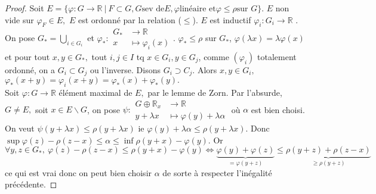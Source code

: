 \begin{proof}
    Soit $E=\{\varphi :G\to \mathbb{R} \ |\ F\subset G,G \text{sev de}E, \varphi \text{linéaire et}\varphi \le \rho \text{sur }G\} $. $E$ non vide sur $\varphi _F\in E,$ $E$ est ordonné par la relation ($\le $).  $E$ est inductif $\varphi _i:G_i\to \mathbb{R} $ . On pose $G_*=\bigcup\limits_{i \in G_i} $ et $\varphi _* :\begin{aligned}
        G_* &\longrightarrow \mathbb{R}  \\
        x &\longmapsto \varphi _i(x)
    \end{aligned}$.
    $\varphi _*\le \rho$ sur $G_*$, $\varphi (\lambda x)=\lambda \varphi (x)$ et pour tout $x,y\in G_*,$ tout $i,j\in I$ tq $x\in G_i,y\in G_j$, comme $(\varphi _i)$ totalement ordonné, on a $G_i\subset G_j$ ou l'inverse. Disons $G_i\supset C_j.$ Alors $x,y\in G_i,$ $\varphi_* (x+y)=\varphi _i(x+y)=\varphi _*(x)+\varphi _*(y).$ \\
    Soit $\varphi :G\to \mathbb{R} $ élément maximal de $E,$ par le lemme de Zorn. Par l'absurde, $G\neq E,$ soit $x\in E\backslash G$, on pose $\psi :\begin{aligned}
        G\oplus \mathbb{R} _x &\longrightarrow \mathbb{R}  \\
        y+\lambda x &\longmapsto \varphi (y)+\lambda \alpha
    \end{aligned}$ où $\alpha $ est bien choisi. On veut $\psi(y+\lambda x)\le \rho(y+\lambda x)$ ie $\varphi (y)+\lambda \alpha \le \rho(y+\lambda x)$. Donc $\sup \varphi (z)-\rho(z-x)\le \alpha \le \inf \rho(y+x)-\varphi (y).$ Or $\forall y,z\in G_*,\ \varphi (z)-\rho(z-x)\le \rho(y+x)-\varphi (y)\Leftrightarrow \underbrace{\varphi (y)+\varphi (z)}_{=\varphi (y+z)}\le \underbrace{\rho(y+z)+\rho(z-x)}_{\ge \rho(y+z)} $ ce qui est vrai donc on peut bien choisir $\alpha $ de sorte à respecter l'inégalité précédente.
\end{proof}
